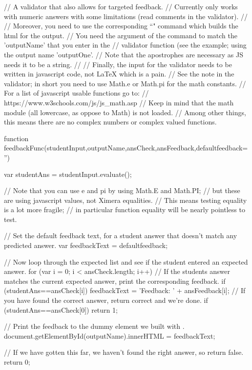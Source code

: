 \documentclass{ximera}
\begin{document}
\begin{javascript}
//  A validator that also allows for targeted feedback. 
//  Currently only works with numeric answers with some limitations (read comments in the validator). 
//  
//  Moreover, you need to use the corresponding ``\feedbackOutput" command which builds the html for the output.
//  You need the argument of the \feedbackOutput command to match the 'outputName' that you enter in the
//      validator function (see the example; using the output name 'outputOne'. 
//      Note that the apostrophes are necessary as JS needs it to be a string.
//
//  Finally, the input for the validator needs to be written in javascript code, not LaTeX which is a pain.
//      See the note in the validator; in short you need to use Math.e or Math.pi for the math constants.
//      For a list of javascript usable functions go to:
//          https://www.w3schools.com/js/js_math.asp
//      Keep in mind that the math module (all lowercase, as oppose to Math) is not loaded.
//          Among other things, this means there are no complex numbers or complex valued functions.


function feedbackFunc(studentInput,outputName,ansCheck,ansFeedback,defaultfeedback='') {
    var studentAns = studentInput.evaluate();
    
    // Note that you can use e and pi by using Math.E and Math.PI; 
    //      but these are using javascript values, not Ximera equalities.
    // This means testing equality is a lot more fragile; 
    //      in particular function equality will be nearly pointless to test.
    
    // Set the default feedback text, for a student answer that doesn't match any predicted answer.
    var feedbackText = defaultfeedback;
        
    // Now loop through the expected list and see if the student entered an expected answer.
    for (var i = 0; i < ansCheck.length; i++) {
        // If the students answer matches the current expected answer, print the corresponding feedback.
        if (studentAns==ansCheck[i]) {
            feedbackText = 'Feedback: ' + ansFeedback[i];
        }
        // If you have found the correct answer, return correct and we're done.
        if (studentAns==ansCheck[0]) {
            return 1;
            } 
    }
    
    // Print the feedback to the dummy element we built with \feedbackOutput.
    document.getElementById(outputName).innerHTML = feedbackText;
    
    // If we have gotten this far, we haven't found the right answer, so return false.
    return 0;
}
\end{javascript}
\end{document}
